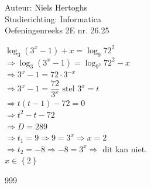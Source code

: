 \documentclass[a4paper]{article}
\begin{document}
  
\noindent \large Auteur: Niels Hertoghs \\
\noindent \large Studierichting: Informatica\\
\noindent \large Oefeningenreeks 2E nr. 26.25\\

\medskip
\normalsize

$\log_3 \left(3^x-1\right) + x = \log_9 72^2$ \\

$\Rightarrow \log_3 \left(3^x-1\right)= \log_{9^2} 72^2 - x$\\

$\Rightarrow 3^x - 1 = 72 \cdot 3^{-x} $\\

$\Rightarrow 3^x - 1 = \dfrac{72}{3^x} \text{ stel } 3^x = t$\\

$\Rightarrow t(t-1) -72 = 0$\\

$\Rightarrow t^2 - t - 72$ \\

$\Rightarrow D = 289$\\

$\Rightarrow t_1 = 9 \Rightarrow 9 = 3^x \Rightarrow x = 2$ \\

$\Rightarrow t_2 = -8 \Rightarrow - 8 = 3^x \Rightarrow $ dit kan niet.\\

$x \in \left\{ 2 \right\} $

\begin{thebibliography}{999}
\end{thebibliography}
\end{document}

